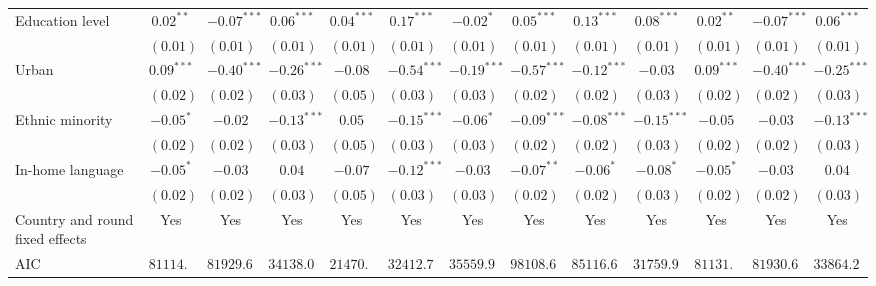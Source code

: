\begin{table}
\begin{center}
\begin{threeparttable}
\begin{tabular}{l c c c c c c c c c c c c}
Education level                 & $0.02^{**}$   & $-0.07^{***}$ & $0.06^{***}$  & $0.04^{***}$ & $0.17^{***}$  & $-0.02^{*}$   & $0.05^{***}$  & $0.13^{***}$  & $0.08^{***}$  & $0.02^{**}$   & $-0.07^{***}$ & $0.06^{***}$  \\
                                & $(0.01)$      & $(0.01)$      & $(0.01)$      & $(0.01)$     & $(0.01)$      & $(0.01)$      & $(0.01)$      & $(0.01)$      & $(0.01)$      & $(0.01)$      & $(0.01)$      & $(0.01)$      \\
Urban                           & $0.09^{***}$  & $-0.40^{***}$ & $-0.26^{***}$ & $-0.08$      & $-0.54^{***}$ & $-0.19^{***}$ & $-0.57^{***}$ & $-0.12^{***}$ & $-0.03$       & $0.09^{***}$  & $-0.40^{***}$ & $-0.25^{***}$ \\
                                & $(0.02)$      & $(0.02)$      & $(0.03)$      & $(0.05)$     & $(0.03)$      & $(0.03)$      & $(0.02)$      & $(0.02)$      & $(0.03)$      & $(0.02)$      & $(0.02)$      & $(0.03)$      \\
Ethnic minority                 & $-0.05^{*}$   & $-0.02$       & $-0.13^{***}$ & $0.05$       & $-0.15^{***}$ & $-0.06^{*}$   & $-0.09^{***}$ & $-0.08^{***}$ & $-0.15^{***}$ & $-0.05$       & $-0.03$       & $-0.13^{***}$ \\
                                & $(0.02)$      & $(0.02)$      & $(0.03)$      & $(0.05)$     & $(0.03)$      & $(0.03)$      & $(0.02)$      & $(0.02)$      & $(0.03)$      & $(0.02)$      & $(0.02)$      & $(0.03)$      \\
In-home language                & $-0.05^{*}$   & $-0.03$       & $0.04$        & $-0.07$      & $-0.12^{***}$ & $-0.03$       & $-0.07^{**}$  & $-0.06^{*}$   & $-0.08^{*}$   & $-0.05^{*}$   & $-0.03$       & $0.04$        \\
                                & $(0.02)$      & $(0.02)$      & $(0.03)$      & $(0.05)$     & $(0.03)$      & $(0.03)$      & $(0.02)$      & $(0.02)$      & $(0.03)$      & $(0.02)$      & $(0.02)$      & $(0.03)$      \\
\midrule
Country and round fixed effects & Yes           & Yes           & Yes           & Yes          & Yes           & Yes           & Yes           & Yes           & Yes           & Yes           & Yes           & Yes           \\
AIC                             & $81114.79$    & $81929.65$    & $34138.09$    & $21470.20$   & $32412.79$    & $35559.92$    & $98108.68$    & $85116.65$    & $31759.91$    & $81131.78$    & $81930.65$    & $33864.24$    \\

\end{tabular}
\end{threeparttable}
\end{center}
\end{table}
